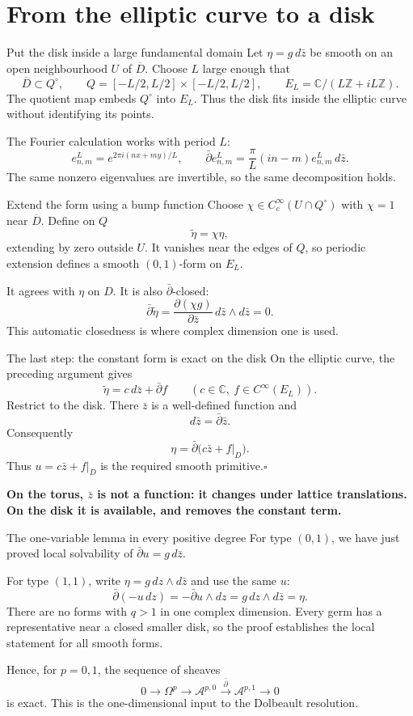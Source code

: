 \documentclass[aspectratio=169,11pt]{beamer}
\newcommand{\db}{\bar\partial}
\newcommand{\C}{\mathbb C}
\newcommand{\Z}{\mathbb Z}
\newcommand{\A}{\mathcal A}
\begin{document}
\section{From the elliptic curve to a disk}
\begin{frame}{Put the disk inside a large fundamental domain}
Let $\eta=g\,d\bar z$ be smooth on an open neighbourhood $U$ of
$\overline D$. Choose $L$ large enough that
\[
 \overline D\subset Q^\circ,\qquad
 Q=[-L/2,L/2]\times[-L/2,L/2],\qquad
 E_L=\C/(L\Z+iL\Z).
\]
The quotient map embeds $Q^\circ$ into $E_L$.
Thus the disk fits inside the elliptic curve without identifying its points.

The Fourier calculation works with period $L$:
\[
 e^L_{n,m}=e^{2\pi i(nx+my)/L},\qquad
 \db e^L_{n,m}=\frac{\pi}{L}(in-m)e^L_{n,m}\,d\bar z.
\]
The same nonzero eigenvalues are invertible, so the same decomposition holds.
\end{frame}

\begin{frame}{Extend the form using a bump function}
Choose $\chi\in C_c^\infty(U\cap Q^\circ)$ with
$\chi=1$ near $\overline D$.
Define on $Q$
\[
 \widetilde\eta=\chi\eta,
\]
extending by zero outside $U$. It vanishes near the edges of $Q$, so
periodic extension defines a smooth $(0,1)$-form on $E_L$.

It agrees with $\eta$ on $D$. It is also $\db$-closed:
\[
 \db\widetilde\eta
 =\frac{\partial(\chi g)}{\partial\bar z}\,
 d\bar z\wedge d\bar z=0.
\]
This automatic closedness is where complex dimension one is used.
\end{frame}

\begin{frame}{The last step: the constant form is exact on the disk}
On the elliptic curve, the preceding argument gives
\[
 \widetilde\eta=c\,d\bar z+\db f
 \qquad(c\in\C,\ f\in C^\infty(E_L)).
\]
Restrict to the disk. There $\bar z$ is a well-defined function and
\[
 d\bar z=\db\bar z.
\]
Consequently
\[
 \eta=\db\bigl(c\bar z+f|_D\bigr).
\]
Thus $u=c\bar z+f|_D$ is the required smooth primitive.\hfill$\square$

\textbf{On the torus, $\bar z$ is not a function: it changes under lattice
translations. On the disk it is available, and removes the constant term.}
\end{frame}

\begin{frame}{The one-variable lemma in every positive degree}
For type $(0,1)$, we have just proved local solvability of
$\db u=g\,d\bar z$.

For type $(1,1)$, write $\eta=g\,dz\wedge d\bar z$ and use the same $u$:
\[
 \db(-u\,dz)
 =-\db u\wedge dz
 =g\,dz\wedge d\bar z=\eta.
\]
There are no forms with $q>1$ in one complex dimension.
Every germ has a representative near a closed smaller disk, so the proof
establishes the local statement for all smooth forms.

Hence, for $p=0,1$, the sequence of sheaves
\[
 0\longrightarrow\Omega^p\longrightarrow\A^{p,0}
 \xrightarrow{\db}\A^{p,1}\longrightarrow0
\]
is exact. This is the one-dimensional input to the Dolbeault resolution.
\end{frame}
\end{document}
